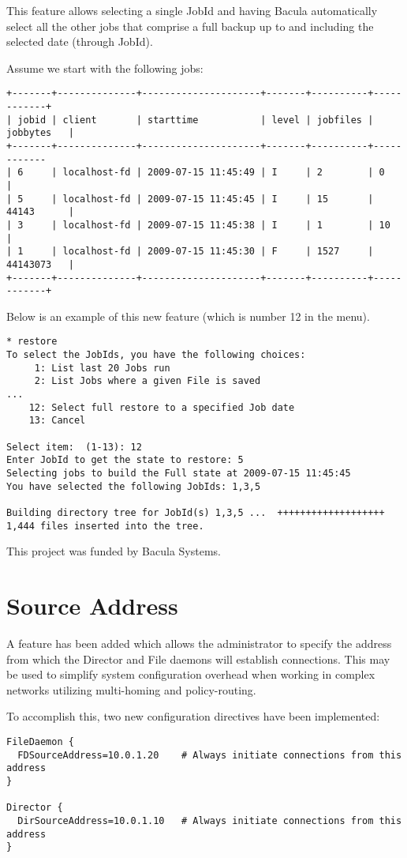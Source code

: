 This feature allows selecting a single JobId and having Bacula
automatically select all the other jobs that comprise a full backup up to
and including the selected date (through JobId).

Assume we start with the following jobs:
\begin{verbatim}
+-------+--------------+---------------------+-------+----------+------------+
| jobid | client       | starttime           | level | jobfiles | jobbytes   |
+-------+--------------+---------------------+-------+----------+------------
| 6     | localhost-fd | 2009-07-15 11:45:49 | I     | 2        | 0          |
| 5     | localhost-fd | 2009-07-15 11:45:45 | I     | 15       | 44143      |
| 3     | localhost-fd | 2009-07-15 11:45:38 | I     | 1        | 10         |
| 1     | localhost-fd | 2009-07-15 11:45:30 | F     | 1527     | 44143073   |
+-------+--------------+---------------------+-------+----------+------------+
\end{verbatim}

Below is an example of this new feature (which is number 12 in the
menu).

\begin{verbatim}
* restore
To select the JobIds, you have the following choices:
     1: List last 20 Jobs run
     2: List Jobs where a given File is saved
...
    12: Select full restore to a specified Job date
    13: Cancel

Select item:  (1-13): 12
Enter JobId to get the state to restore: 5
Selecting jobs to build the Full state at 2009-07-15 11:45:45
You have selected the following JobIds: 1,3,5

Building directory tree for JobId(s) 1,3,5 ...  +++++++++++++++++++
1,444 files inserted into the tree.
\end{verbatim}

This project was funded by Bacula Systems.

\section{Source Address}

A feature has been added which allows the administrator to specify the address
from which the Director and File daemons will establish connections.  This
may be used to simplify system configuration overhead when working in complex
networks utilizing multi-homing and policy-routing.

To accomplish this, two new configuration directives have been implemented:
\begin{verbatim}
FileDaemon {
  FDSourceAddress=10.0.1.20    # Always initiate connections from this address
}

Director {
  DirSourceAddress=10.0.1.10   # Always initiate connections from this address
}
\end{verbatim}

